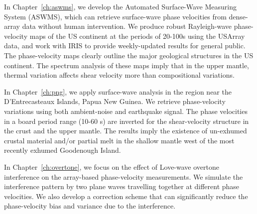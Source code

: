 \documentclass[12pt,oneside]{book}
\begin{document}
In Chapter~\ref{ch:aswms}, we develop the Automated Surface-Wave Measuring System (ASWMS), which can retrieve surface-wave phase velocities from dense-array data without human intervention. We produce robust Rayleigh-wave phase-velocity maps of the US continent at the periods of 20-100s using the USArray data, and work with IRIS to provide weekly-updated results for general public. The phase-velocity maps clearly outline the major geological structures in the US continent. The spectrum analysis of these maps imply that in the upper mantle, thermal variation affects shear velocity more than compositional variations.

In Chapter~\ref{ch:png}, we apply surface-wave analysis in the region near the D'Entrecasteaux Islands, Papua New Guinea. We retrieve phase-velocity variations using both ambient-noise and earthquake signal. The phase velocities in a board period range (10-60 s) are inverted for the shear-velocity structure in the crust and the upper mantle. The results imply the existence of un-exhumed crustal material and/or partial melt in the shallow mantle west of the most recently exhumed Goodenough Island.

In Chapter~\ref{ch:overtone}, we focus on the effect of Love-wave overtone interference on the array-based phase-velocity measurements. We simulate the interference pattern by two plane waves travelling together at different phase velocities. We also develop a correction scheme that can significantly reduce the phase-velocity bias and variance due to the interference. 

\cleardoublepage
\normalsize
\singlespacing


\clearpage
\end{document}
